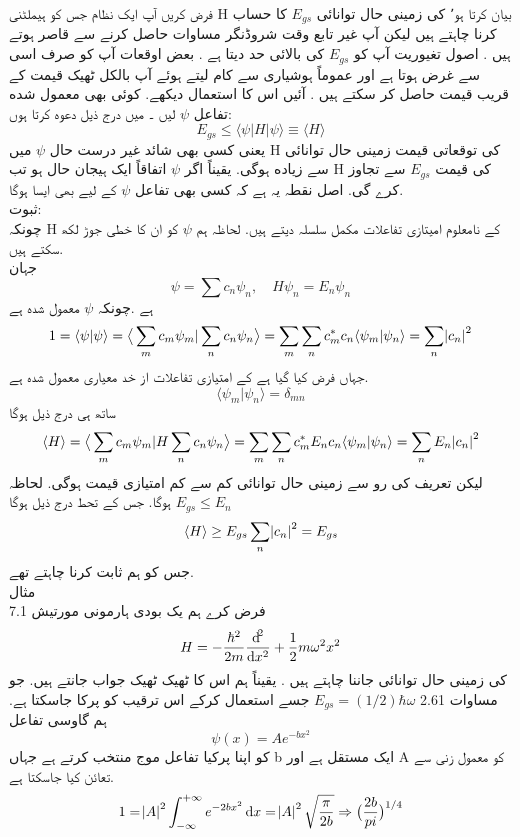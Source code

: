 
فرض کریں آپ ایک نظام جس کو ہیملٹنی H بیان کرتا ہو٬ کی زمینی حال توانائی
 \(E_{gs}\)
   کا حساب کرنا چاہتے ہیں لیکن آپ غير تابع وقت شروڈنگر مساوات حاصل کرنے سے قاصر ہوتے ہیں . اصول تغيوریت آپ کو 
  \(E_{gs}\)
   کی بالائی حد دیتا ہے . بعض اوقعات آپ کو صرف اسی سے غرض ہوتا ہے اور عموماً ہوشیاری سے کام لیتے ہوئے آپ بالکل ٹھیک قیمت کے قريب قیمت حاصل کر سکتے ہیں . آئیں اس کا استعمال دیکھے. کوئی بھی معمول شده تفاعل 
\(\psi\)
    لیں ۔ میں درج ذيل دعوه کرتا ہوں:
\[E_{gs}\le \langle \psi |H|\psi\rangle \equiv \langle H \rangle\]
یعنی کسی بھی شائد غير درست حال 
\(\psi\)
 میں H کی توقعاتی قیمت زمینی حال توانائی سے زياده ہوگی. یقیناً اگر 
 \(\psi\) 
 اتفاقاً ایک ہیجان حال ہو تب H کی قیمت
  \(E_{gs}\) 
 سے تجاوز کرے گی. اصل نقطہ یہ ہے کہ کسی بھی تفاعل 
 \(\psi\)
  کے لیے بھی ایسا ہوگا.\\
ثبوت: \\
چونکہ H کے نامعلوم امیتازی تفاعلات مكمل سلسلہ دیتے ہیں. لحاظہ ہم 
\(\psi\) 
کو ان کا خطی جوڑ لکھ سکتے ہیں.\\
جہان
\[\psi=\sum c_{n}\psi_{n}, \quad H\psi_{n}=E_{n}\psi_{n}\] 
ہے .چونکہ 
\(\psi\) 
معمول شده ہے\\
\[1=\langle \psi |\psi\rangle=\big\langle \sum_{m} c_{m}\psi_{m}|\sum_{n}c_{n}\psi_{n}\big\rangle=\sum_{m}\sum_{n}c_{m}^{*}c_{n}\langle \psi_{m}|\psi_{n}\rangle=\sum_{n}\abs{c_{n}}^{2}\]
جہاں فرض کیا گیا ہے کے امتیازی تفاعلات از خد معیاری معمول شدہ ہے.
\[\langle \psi_{m}|\psi_{n}\rangle=\delta_{mn}\]
ساتھ ہی درج ذیل ہوگا
\[\langle H \rangle=\big\langle \sum_{m} c_{m}\psi_{m}|H\sum_{n}c_{n}\psi_{n}\big\rangle=\sum_{m}\sum_{n}c_{m}^{*}E_{n}c_{n}\langle \psi_{m}|\psi_{n}\rangle=\sum_{n}E_{n}\abs{c_{n}}^{2}\]
ليكن تعريف کی رو سے زمینی حال توانائی کم سے کم  امتیازی قیمت ہوگی. لحاظہ
\(E_{gs}\le E_{n}\)
ہوگا. جس کے تحط درج ذیل ہوگا
\[\langle H \rangle \ge E_{gs}\sum_{n}\abs{c_{n}}^{2}=E_{gs}\]
جس کو ہم ثابت کرنا چاہتے تھے.\\
مثال \\7.1
فرض كرے ہم یک بودی ہارمونی مورتیش
\[H=-\frac{\hbar^{2}}{2m}\frac{\dif^{2}}{\dif{x^{2}}}+\frac{1}{2}m\omega^{2}x^{2}\]
کی زمینی حال توانائی جاننا چاہتے ہیں . یقیناً ہم اس کا ٹھیک ٹھیک جواب جانتے ہیں. جو مساوات 2.61
\(E_{gs}=(1/2)\hbar\omega\)
جسے استعمال کرکے اس ترقيب کو پرکا جاسکتا ہے. ہم گاوسی تفاعل
 \[\psi(x)=Ae^{-bx^{2}}\] 
کو اپنا پرکیا تفاعل موج منتخب کرتے ہے جہاں b ایک مستقل ہے اور A کو معمول زنی سے تعائن کیا جاسکتا ہے.
\[1=\abs{A}^{2}\int_{-\infty}^{+\infty}e^{-2bx^{2}}\dif{x}=\abs{A}^{2}\sqrt{\frac{\pi}{2b}}\Rightarrow \big (\frac{2b}{pi}\big )^{1/4}\]
